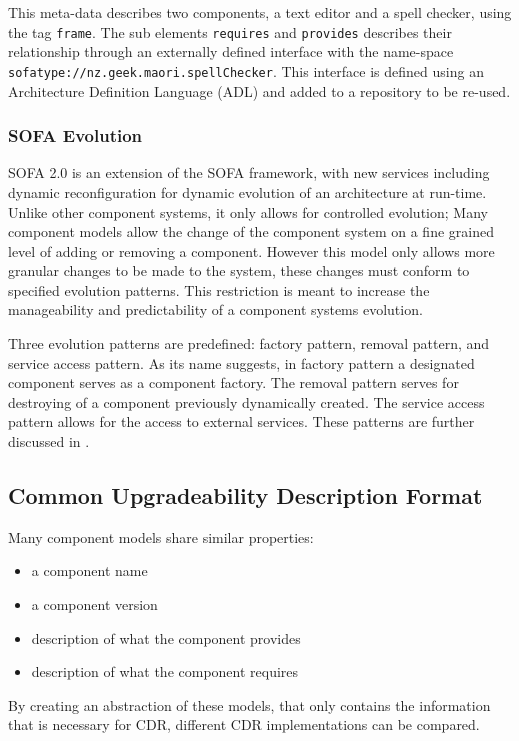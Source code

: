 This meta-data describes two components, a text editor and a spell checker, using the tag \verb+frame+.
The sub elements \verb+requires+ and \verb+provides+ describes their relationship through an externally defined interface with the name-space \verb+sofatype://nz.geek.maori.spellChecker+.
This interface is defined using an Architecture Definition Language (ADL) and added to a repository to be re-used. 


\subsubsection{SOFA Evolution}
SOFA 2.0 is an extension of the SOFA framework, with new services including dynamic reconfiguration for dynamic evolution of an architecture at run-time. 
Unlike other component systems,
it only allows for controlled evolution; 
Many component models allow the change of the component system on a fine grained level of adding or removing a component.
However this model only allows more granular changes to be made to the system, these changes must conform to specified evolution patterns.
This restriction is meant to increase the manageability and predictability of a component systems evolution. 

Three evolution patterns are predefined: factory pattern, removal pattern, and service access pattern.
As its name suggests, in factory pattern a designated component serves as a component factory. 
The removal pattern serves for destroying of a component previously dynamically created.
The service access pattern allows for the access to external services.
These patterns are further discussed in \cite{Hnetynka2006}.


\subsection{Common Upgradeability Description Format}
Many component models share similar properties:
\begin{itemize}
  \item a component name
  \item a component version
  \item description of what the component provides
  \item description of what the component requires
\end{itemize} 

By creating an abstraction of these models, that only contains the information that is necessary for CDR, different CDR implementations can be compared.

